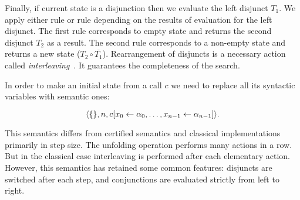 Finally, if current state is a disjunction then we evaluate the left disjunct $T_1$. We apply either rule  or rule  depending
on the results of evaluation for the left disjunct. The first rule corresponds to empty state and returns the second disjunct $T_2$ as a result. The second rule corresponds
to a non-empty state and returns a new state ($T_2 \circ \bar{T_1}$). Rearrangement of disjuncts is a necessary action called \emph{interleaving}~\cite{fair:interleaving}.
It guarantees the completeness of the search.

In order to make an initial state from a call $c$ we need to replace all its syntactic variables with semantic ones:

\[
\langle \{\}, n, c[x_0 \leftarrow \alpha_0, \ldots, x_{n-1} \leftarrow \alpha_{n-1}] \rangle.
\]

This semantics differs from certified semantics and classical implementations primarily in step size. The unfolding operation performs many actions in a row.
But in the classical case interleaving is performed after each elementary action. However, this semantics has retained some common features: disjuncts are switched 
after each step, and conjunctions are evaluated strictly from left to right. 


\begin{comment}
\[
\begin{array}{l}
\inbr{\{\}, 1, \mbox{\lstinline{revers}}^o \, [1] \; \alpha_0 : \epsilon} 
\xrightarrow{\circ} \\
\inbr{\{\alpha_1 = 1; \alpha_2 = []\}, 4, \mbox{\lstinline{revers}}^o \, \alpha_2 \; \alpha_3 : \mbox{\lstinline{append}}^o \, \alpha_3 \; [\alpha_1] \; \alpha_0 : \epsilon}
\xrightarrow{\circ} \\
\inbr{\{\alpha_1 = 1; \alpha_2 = []; \alpha_3 = []\}, 4, \mbox{\lstinline{append}}^o \, \alpha_3 \; [\alpha_1] \; \alpha_0 : \epsilon} 
\xrightarrow{\circ} \\
\inbr{\{\alpha_1 = 1; \alpha_2 = []; \alpha_3 = []\; \alpha_0 = [\alpha_1]\}, \epsilon}
\xrightarrow{\{\alpha_1 = 1; \alpha_2 = []; \alpha_3 = []\; \alpha_0 = [\alpha_1]\}} \emptyset
\end{array}
\]
\end{comment}

